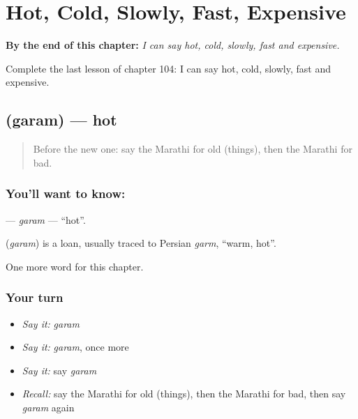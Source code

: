 
\chapter{Hot, Cold, Slowly, Fast, Expensive}
\label{ch:mr-hot-cold-slowly-fast-expensive}

\begin{chapteropening}
\textbf{By the end of this chapter:} \emph{I can say hot, cold, slowly, fast and expensive.}

Complete the last lesson of chapter 104: I can say hot, cold, slowly, fast and expensive.
\end{chapteropening}

\section[\texorpdfstring{\mr{गरम} (garam)}{गरम (garam)}]{ (garam) — hot}

\label{lesson:MR-C104-garam}



\begin{quote}
Before the new one: say the Marathi for old (things), then the Marathi for bad.
\end{quote}

\subsection*{You'll want to know: }
\textbf{} — \emph{garam} — \textquotedblleft{}hot\textquotedblright{}.

\begin{cousinweb}
\textbf{} (\emph{garam}) is a loan, usually traced to Persian \emph{garm}, \textquotedblleft{}warm, hot\textquotedblright{}.
\end{cousinweb}

\begin{grammarlens}[title={What you've built}]
One more word for this chapter.
\end{grammarlens}

\subsection*{Your turn}
\begin{itemize}
\raggedright
  \item \emph{Say it:} \emph{garam}
  \item \emph{Say it:} \emph{garam}, once more
  \item \emph{Say it:} say \emph{garam}
  \item \emph{Recall:} say the Marathi for old (things), then the Marathi for bad, then say \emph{garam} again
\end{itemize}


